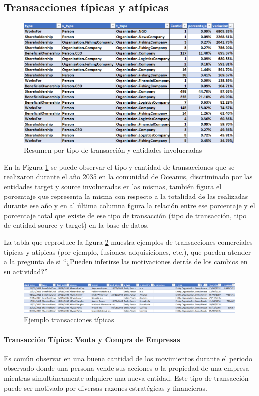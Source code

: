 \documentclass[11pt,spanish,a4paper]{article}
\begin{document}
\subsection{Transacciones típicas y atípicas}

\begin{figure}[H]
    \centering
    \includegraphics[width=0.7\linewidth]{graphs/ejercicio_2_0_.png}
    \caption{Resumen por tipo de transacción y entidades involucradas}
    \label{fig:enter-label3}
\end{figure}

En la Figura \ref{fig:enter-label3} se puede observar el tipo y cantidad de transacciones que se realizaron durante el año 2035 en la comunidad de Oceanus, discriminado por las entidades target y source involucradas en las mismas, también figura el porcentaje que representa la misma con respecto a la totalidad de las realizadas durante ese año y en al última columna figura la relación entre ese porcentaje y el porcentaje total que existe de ese tipo de transacción (tipo de transacción, tipo de entidad source y target) en la base de datos.

La tabla que reproduce la figura \ref{fig:enter-label4} muestra ejemplos de transacciones comerciales típicas y atípicas (por ejemplo, fusiones, adquisiciones, etc.), que pueden atender a la pregunta de si ``¿Pueden inferirse las motivaciones detrás de los cambios en su actividad?''

\begin{figure}[H]
    \centering
    \includegraphics[width=1\linewidth]{graphs/ejercicio_2_1.png}
    \caption{Ejemplo transacciones típicas}
    \label{fig:enter-label4}
\end{figure}


\paragraph{Transacción Típica: Venta y Compra de Empresas}
Es común observar en una buena cantidad de los movimientos durante el periodo observado donde una persona vende sus acciones o la propiedad de una empresa mientras simultáneamente adquiere una nueva entidad. Este tipo de transacción puede ser motivado por diversas razones estratégicas y financieras.
\end{document}

